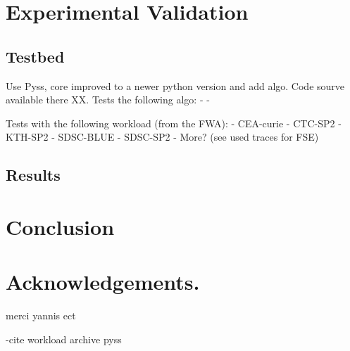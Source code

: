\documentclass{llncs}
\begin{document}
\section{Experimental Validation}
\label{sec:experimental_validation}

\subsection{Testbed}
\label{sub:Testbed}
Use Pyss, core improved to a newer python version and add algo. Code sourve available there XX.
Tests the following algo:
- 
- 

Tests with the following workload (from the FWA):
- CEA-curie
- CTC-SP2
- KTH-SP2
- SDSC-BLUE
- SDSC-SP2
- More? (see used traces for FSE)


\subsection{Results}
\label{sub:Testbed}




\section{Conclusion}
\label{sec:conclusion}





\section*{Acknowledgements.}
\label{sec:ack}
merci yannis ect

-cite
workload archive
pyss




\end{document}
